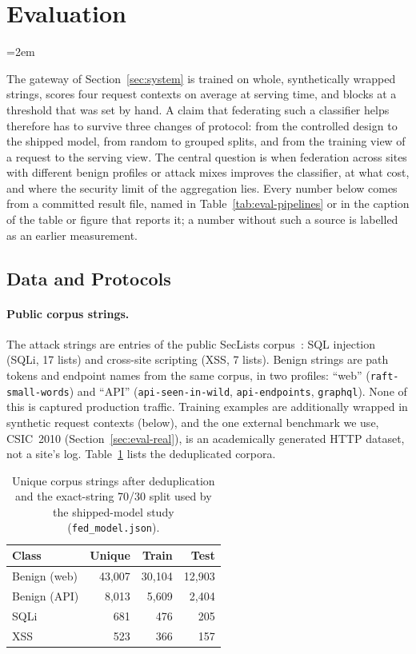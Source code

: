 \section{Evaluation}
\label{sec:evaluation}
\emergencystretch=2em

The gateway of Section~\ref{sec:system} is trained on whole, synthetically wrapped strings, scores four request contexts on average at serving time, and blocks at a threshold that was set by hand. A claim that federating such a classifier helps therefore has to survive three changes of protocol: from the controlled design to the shipped model, from random to grouped splits, and from the training view of a request to the serving view. The central question is when federation across sites with different benign profiles or attack mixes improves the classifier, at what cost, and where the security limit of the aggregation lies. Every number below comes from a committed result file, named in Table~\ref{tab:eval-pipelines} or in the caption of the table or figure that reports it; a number without such a source is labelled as an earlier measurement.

\subsection{Data and Protocols}
\label{sec:eval-setup}

\paragraph{Public corpus strings.}
The attack strings are entries of the public SecLists corpus~\cite{seclists}: SQL injection (SQLi, 17 lists) and cross-site scripting (XSS, 7 lists). Benign strings are path tokens and endpoint names from the same corpus, in two profiles: ``web'' (\texttt{raft-small-words}) and ``API'' (\texttt{api-seen-in-wild}, \texttt{api-endpoints}, \texttt{graphql}). None of this is captured production traffic. Training examples are additionally wrapped in synthetic request contexts (below), and the one external benchmark we use, CSIC~2010 (Section~\ref{sec:eval-real}), is an academically generated HTTP dataset, not a site's log. Table~\ref{tab:eval-corpora} lists the deduplicated corpora.

\begin{table}[t]
\centering
\caption{Unique corpus strings after deduplication and the exact-string 70/30 split used by the shipped-model study (\texttt{fed\_model.json}).}
\label{tab:eval-corpora}
\begin{tabular}{@{}lrrr@{}}
\toprule
\textbf{Class} & \textbf{Unique} & \textbf{Train} & \textbf{Test} \\ \midrule
Benign (web) & 43{,}007 & 30{,}104 & 12{,}903 \\
Benign (API) & 8{,}013 & 5{,}609 & 2{,}404 \\
SQLi & 681 & 476 & 205 \\
XSS & 523 & 366 & 157 \\ \bottomrule
\end{tabular}
\end{table}

